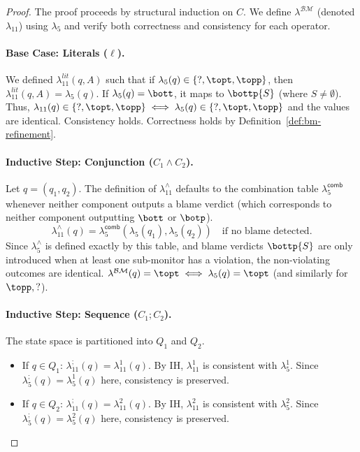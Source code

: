 \begin{definition}
    \begin{proof}
    The proof proceeds by structural induction on $C$. We define $\lambda^{\mathcal{BM}}$ (denoted $\lambda_{11}$) using $\lambda_5$ and verify both correctness and consistency for each operator.
    
    \paragraph{Base Case: Literals ($\ell$).}
    We defined $\lambda_{11}^{\mathit{lit}}(q, A)$ such that if $\lambda_5(q) \in \{\mathsf{?}, \topt, \topp\}$, then $\lambda_{11}^{\mathit{lit}}(q, A) = \lambda_5(q)$.
    If $\lambda_5(q) = \bott$, it maps to $\bottp{S}$ (where $S \neq \emptyset$).
    Thus, $\lambda_{11}(q) \in \{\mathsf{?}, \topt, \topp\} \iff \lambda_5(q) \in \{\mathsf{?}, \topt, \topp\}$ and the values are identical. Consistency holds. Correctness holds by Definition~\ref{def:bm-refinement}.
    
    \paragraph{Inductive Step: Conjunction ($C_1 \wedge C_2$).}
    Let $q = (q_1, q_2)$. The definition of $\lambda_{11}^{\wedge}$ defaults to the combination table $\lambda_5^{\textsf{comb}}$ whenever neither component outputs a blame verdict (which corresponds to neither component outputting $\bott$ or $\botp$).
    \[
    \lambda_{11}^{\wedge}(q) = \lambda_5^{\textsf{comb}}(\lambda_5(q_1), \lambda_5(q_2)) \quad \text{if no blame detected.}
    \]
    Since $\lambda_5^{\wedge}$ is defined exactly by this table, and blame verdicts $\bottp{S}$ are only introduced when at least one sub-monitor has a violation, the non-violating outcomes are identical.
    $\lambda^{\mathcal{BM}}(q) = \topt \iff \lambda_5(q) = \topt$ (and similarly for $\topp, \mathsf{?}$).
    
    \paragraph{Inductive Step: Sequence ($C_1 ; C_2$).}
    The state space is partitioned into $Q_1$ and $Q_2$.
    \begin{itemize}
        \item If $q \in Q_1$: $\lambda_{11}^{;}(q) = \lambda_{11}^1(q)$. By IH, $\lambda_{11}^1$ is consistent with $\lambda_5^1$. Since $\lambda_5^{;}(q) = \lambda_5^1(q)$ here, consistency is preserved.
        \item If $q \in Q_2$: $\lambda_{11}^{;}(q) = \lambda_{11}^2(q)$. By IH, $\lambda_{11}^2$ is consistent with $\lambda_5^2$. Since $\lambda_5^{;}(q) = \lambda_5^2(q)$ here, consistency is preserved.
    \end{itemize}
    

\end{proof}
\end{definition}
